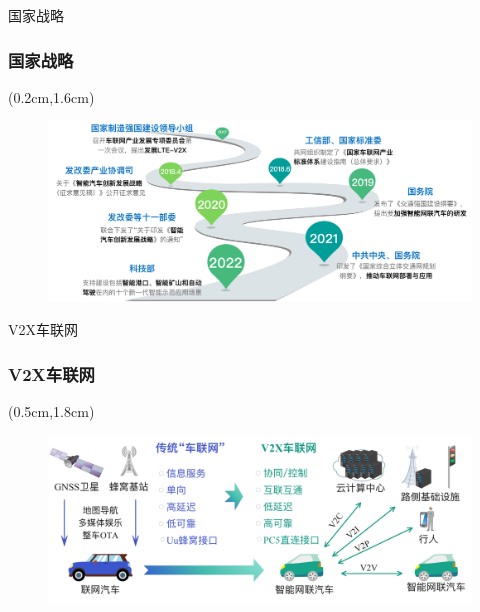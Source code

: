 \begin{frame}{国家战略}
\frametitle{\englishfont 国家战略}
\newBackground
\begin{center}
\begin{textblock*}{\textwidth}(0.2cm,1.6cm)
\begin{figure}
\includegraphics[width=1.1\textwidth]{fig/policy.pdf}
\end{figure}
\end{textblock*}
\end{center}
\end{frame}

\begin{frame}{V2X车联网}
\frametitle{\englishfont V2X车联网}
\newBackground
\begin{center}
\begin{textblock*}{\textwidth}(0.5cm,1.8cm)
\begin{figure}
\includegraphics[width=1.1\textwidth]{fig/v2x-evolution.pdf}
\end{figure}
\end{textblock*}
\end{center}
\end{frame}

